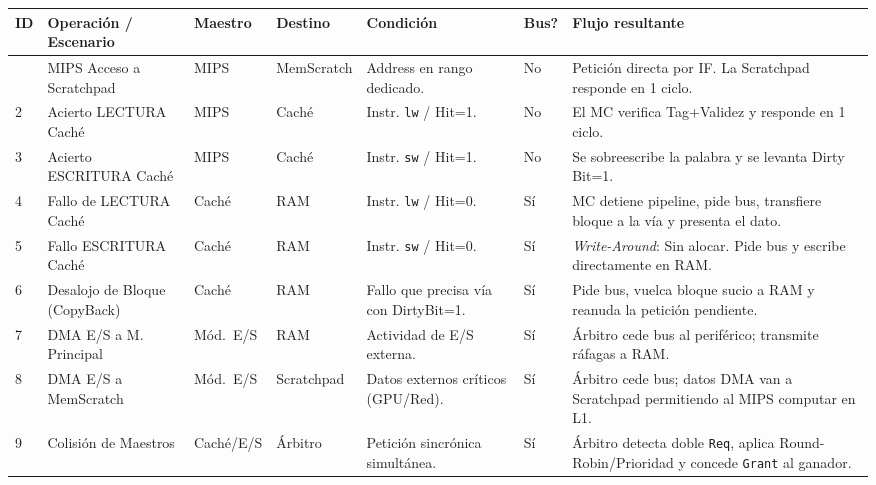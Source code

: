 \documentclass[a4paper,11pt]{article}
\begin{document}
\begin{longtable}{|p{0.45cm}|p{4.0cm}|p{1.6cm}|p{2.2cm}|p{3.5cm}|p{1.0cm}|p{4.0cm}|}
\hline
\textbf{ID} &
\textbf{Operaci\'on / Escenario} &
\textbf{Maestro} &
\textbf{Destino} &
\textbf{Condici\'on} &
\textbf{Bus?} &
\textbf{Flujo resultante} \\
\hline
\endhead
\hline
\endfoot
1 & MIPS Acceso a Scratchpad     & MIPS    & MemScratch & Address en rango dedicado.                           & No  & Petici\'on directa por IF. La Scratchpad responde en 1 ciclo. \\
\hline
2 & Acierto LECTURA Cach\'e      & MIPS    & Cach\'e     & Instr. \texttt{lw} / Hit=1.                          & No  & El MC verifica Tag+Validez y responde en 1 ciclo. \\
\hline
3 & Acierto ESCRITURA Cach\'e    & MIPS    & Cach\'e     & Instr. \texttt{sw} / Hit=1.                          & No  & Se sobreescribe la palabra y se levanta Dirty Bit=1. \\
\hline
4 & Fallo de LECTURA Cach\'e     & Cach\'e  & RAM         & Instr. \texttt{lw} / Hit=0.                          & S\'i & MC detiene pipeline, pide bus, transfiere bloque a la v\'ia y presenta el dato. \\
\hline
5 & Fallo ESCRITURA Cach\'e      & Cach\'e  & RAM         & Instr. \texttt{sw} / Hit=0.                          & S\'i & \textit{Write-Around}: Sin alocar. Pide bus y escribe directamente en RAM. \\
\hline
6 & Desalojo de Bloque (CopyBack)& Cach\'e  & RAM         & Fallo que precisa v\'ia con DirtyBit=1.               & S\'i & Pide bus, vuelca bloque sucio a RAM y reanuda la petici\'on pendiente. \\
\hline
7 & DMA E/S a M. Principal       & M\'od.\ E/S & RAM      & Actividad de E/S externa.                             & S\'i & \'Arbitro cede bus al perif\'erico; transmite r\'afagas a RAM. \\
\hline
8 & DMA E/S a MemScratch         & M\'od.\ E/S & Scratchpad& Datos externos cr\'iticos (GPU/Red).                  & S\'i & \'Arbitro cede bus; datos DMA van a Scratchpad permitiendo al MIPS computar en L1. \\
\hline
9 & Colisi\'on de Maestros        & Cach\'e/E/S & \'Arbitro  & Petici\'on sincr\'onica simult\'anea.                  & S\'i & \'Arbitro detecta doble \texttt{Req}, aplica Round-Robin/Prioridad y concede \texttt{Grant} al ganador. \\
\hline
\end{longtable}
\end{document}
